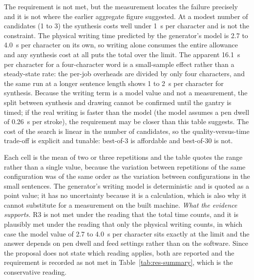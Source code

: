 
            The requirement is not met, but the measurement locates the failure precisely and it is not where the earlier aggregate figure suggested.
            At a modest number of candidates (1 to 3) the synthesis costs well under 1~s per character and is not the constraint.
            The physical writing time predicted by the generator's model is 2.7 to 4.0~s per character on its own, so writing alone consumes the entire allowance and any synthesis cost at all puts the total over the limit.
            The apparent 16.1~s per character for a four-character word is a small-sample effect rather than a steady-state rate: the per-job overheads are divided by only four characters, and the same run at a longer sentence length shows 1 to 2~s per character for synthesis.
            Because the writing term is a model value and not a measurement, the split between synthesis and drawing cannot be confirmed until the gantry is timed; if the real writing is faster than the model (the model assumes a pen dwell of 0.26~s per stroke), the requirement may be closer than this table suggests.
            The cost of the search is linear in the number of candidates, so the quality-versus-time trade-off is explicit and tunable: best-of-3 is affordable and best-of-30 is not.


            Each cell is the mean of two or three repetitions and the table quotes the range rather than a single value, because the variation between repetitions of the same configuration was of the same order as the variation between configurations in the small sentences.
            The generator's writing model is deterministic and is quoted as a point value; it has no uncertainty because it is a calculation, which is also why it cannot substitute for a measurement on the built machine.
            \emph{What the evidence supports.}
            R3 is not met under the reading that the total time counts, and it is plausibly met under the reading that only the physical writing counts, in which case the model value of 2.7 to 4.0~s per character sits exactly at the limit and the answer depends on pen dwell and feed settings rather than on the software.
            Since the proposal does not state which reading applies, both are reported and the requirement is recorded as not met in Table~\ref{tab:res-summary}, which is the conservative reading.



